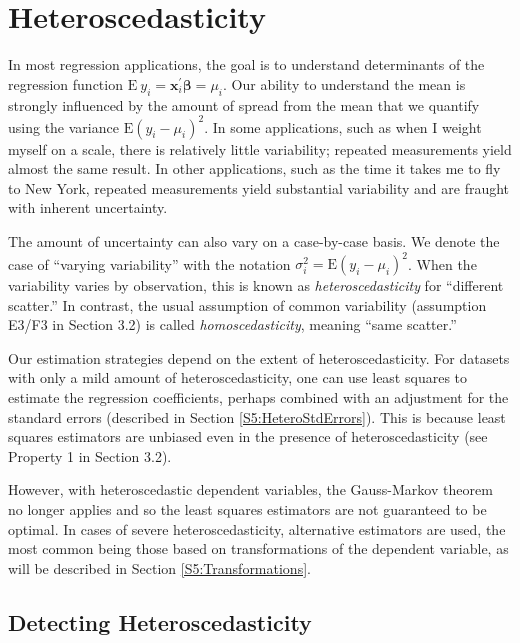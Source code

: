 

\section{Heteroscedasticity}\label{S5:Heteroscedasticity}

In most regression applications, the goal is to understand
determinants of the regression function $\mathrm{E~}y_i =
\mathbf{x}_i^{\prime} \boldsymbol \beta =\mu_i$. Our ability to
understand the mean is strongly influenced by the amount of spread
from the mean that we quantify using the variance
$\mathrm{E}\left(y_i-\mu_i\right)^2$. In some applications, such as
when I weight myself on a scale, there is relatively little
variability; repeated measurements yield almost the same result. In
other applications, such as the time it takes me to fly to New York,
repeated measurements yield substantial variability and are fraught
with inherent uncertainty.

The amount of uncertainty can also vary on a case-by-case basis. We
denote the case of ``varying variability'' with the notation
$\sigma_i^2=\mathrm{E}\left(y_i-\mu_i\right)^2$. When the
variability varies by observation, this is known as
\emph{heteroscedasticity} for ``different scatter.''  In contrast,
the usual assumption of common variability (assumption E3/F3 in
Section 3.2) is called \textit{homoscedasticity}, meaning ``same
scatter.''

Our estimation strategies depend on the extent of
heteroscedasticity. For datasets with only a mild amount of
heteroscedasticity, one can use least squares to estimate the
regression coefficients, perhaps combined with an adjustment for the
standard errors (described in Section \ref{S5:HeteroStdErrors}).
This is because least squares estimators are unbiased even in the
presence of heteroscedasticity (see Property 1 in Section 3.2).

However, with heteroscedastic dependent variables, the Gauss-Markov
theorem no longer applies and so the least squares estimators are
not guaranteed to be optimal. In cases of severe heteroscedasticity,
alternative estimators are used, the most common being those based
on transformations of the dependent variable, as will be described
in Section \ref{S5:Transformations}.

\subsection{Detecting Heteroscedasticity}

